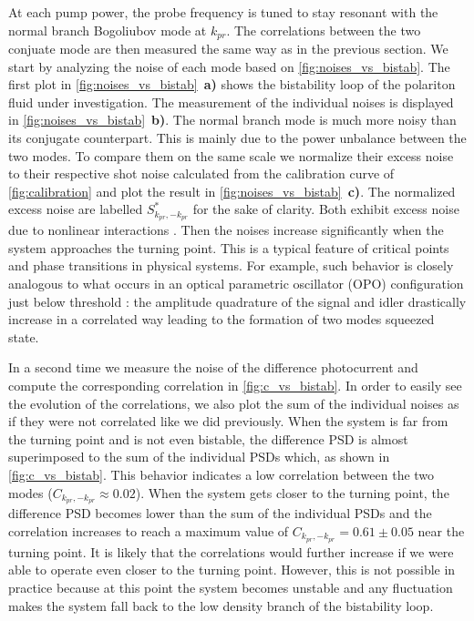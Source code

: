 At each pump power, the probe frequency is tuned to stay resonant with the normal branch Bogoliubov mode at $k_{pr}$. The correlations between the two conjuate mode are then measured the same way as in the previous section. 
We start by analyzing the noise of each mode based on \autoref{fig:noises_vs_bistab}. The first plot in \autoref{fig:noises_vs_bistab}~\textbf{a)} shows the bistability loop of the polariton fluid under investigation. 
The measurement of the individual noises is displayed in \autoref{fig:noises_vs_bistab}~\textbf{b)}. The normal branch mode is much more noisy than its conjugate counterpart. This is mainly due to the power unbalance between the two modes. To compare them 
on the same scale we normalize their excess noise to their respective shot noise calculated from the calibration curve of \autoref{fig:calibration} and plot the result in \autoref{fig:noises_vs_bistab}~\textbf{c)}. The normalized excess noise are labelled $S_{k_{pr},-k_{pr}}^*$ for the sake of clarity. Both exhibit excess noise due to nonlinear interactions \cite{a_baas_quantum_degeneracy2006}. Then the noises increase significantly when the system
approaches the turning point. This is a typical feature of critical points and phase transitions in physical systems. For example, such behavior is closely analogous to what occurs in an optical parametric oscillator (OPO) configuration just below threshold
\cite{Zhang:06} : the amplitude quadrature of the signal and idler drastically increase in a correlated way
leading to the formation of two modes squeezed state. 

\bigskip


In a second time we measure the noise of the difference photocurrent and compute the corresponding correlation in \autoref{fig:c_vs_bistab}. In order to easily see the evolution of the correlations, we also plot the sum of the individual noises as if they were not correlated like we did previously. When the system is far from the turning point and is not even bistable, the difference PSD is almost superimposed to the sum of the individual PSDs which, as shown in \autoref{fig:c_vs_bistab}. This behavior indicates a low correlation between the two modes ($C_{k_{pr},-k_{pr}}\approx0.02$).
When the system gets closer to the turning point, the difference PSD becomes lower than the sum of the individual PSDs and the correlation increases to reach a maximum value of $C_{k_{pr},-k_{pr}}=0.61\pm0.05$ near the turning point. It is likely that the correlations would further increase if we were able to operate even closer to the turning point. However, this is not possible in practice because at this point the system becomes
unstable and any fluctuation makes the system fall back to the low density branch of the bistability loop.

